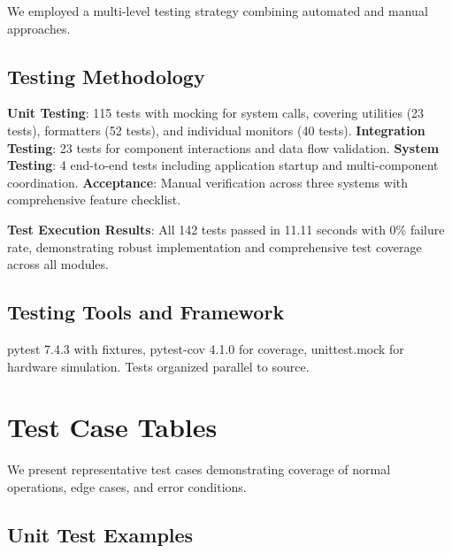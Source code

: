 \documentclass[12pt,a4paper,oneside]{report}
\begin{document}
We employed a multi-level testing strategy combining automated and manual approaches.

\subsection{Testing Methodology}

\textbf{Unit Testing}: 115 tests with mocking for system calls, covering utilities (23 tests), formatters (52 tests), and individual monitors (40 tests). \textbf{Integration Testing}: 23 tests for component interactions and data flow validation. \textbf{System Testing}: 4 end-to-end tests including application startup and multi-component coordination. \textbf{Acceptance}: Manual verification across three systems with comprehensive feature checklist.

\textbf{Test Execution Results}: All 142 tests passed in 11.11 seconds with 0\% failure rate, demonstrating robust implementation and comprehensive test coverage across all modules.

\subsection{Testing Tools and Framework}

pytest 7.4.3 with fixtures, pytest-cov 4.1.0 for coverage, unittest.mock for hardware simulation. Tests organized parallel to source.

\section{Test Case Tables}
\label{sec:test-cases}

We present representative test cases demonstrating coverage of normal operations, edge cases, and error conditions.

\subsection{Unit Test Examples}
\end{document}
